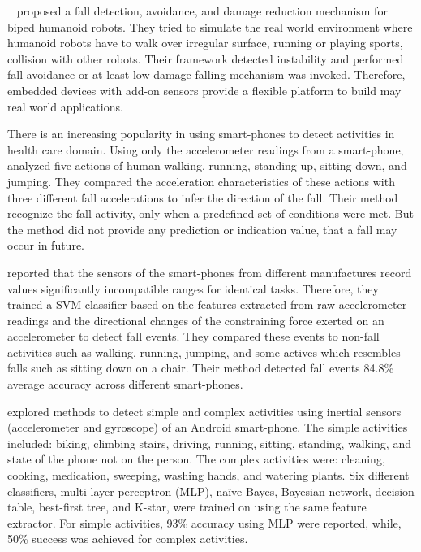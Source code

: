 \documentclass[letterpaper]{article}
\begin{document}
\begin{sloppy}
{~\cite{moya2014fall}} proposed a fall detection, avoidance, and damage 
reduction mechanism for biped humanoid robots. They tried to simulate the real world environment 
where humanoid robots have to walk over irregular surface, running or playing sports, collision 
with other robots. Their framework detected instability and performed fall avoidance or at 
least low-damage falling mechanism was invoked. Therefore, embedded devices  with add-on sensors 
provide a flexible platform to build may real world applications. 


There is an increasing popularity in using smart-phones to detect activities in health care domain. 
Using only the accelerometer readings from a smart-phone, \cite{bai2013recognition} analyzed five 
actions of human walking, running, standing up, sitting down, and jumping. They compared the 
acceleration characteristics of these actions with three different fall accelerations to infer the 
direction of the fall. Their method recognize the fall activity, only when a predefined set of 
conditions were met. But the method did not provide any prediction or indication value, that a fall 
may occur in future. 

\cite{steidl2012fall} reported that the sensors of the smart-phones from different manufactures 
record values significantly incompatible ranges for identical tasks. Therefore, they trained a SVM 
classifier based on the features extracted from raw accelerometer readings and the directional 
changes of the constraining force exerted on an accelerometer to detect fall events. They compared 
these events to non-fall activities such as walking, running, jumping, and some actives which 
resembles falls such as sitting down on a chair. Their method detected fall events 84.8\% average 
accuracy across different smart-phones. 

\cite{DernbachDKTC12} explored methods to detect simple and complex activities using inertial 
sensors (accelerometer and gyroscope) of an Android smart-phone. The simple activities included: 
biking, climbing stairs, driving, running, sitting, standing, walking, and state of the phone not 
on the person. The complex activities were: cleaning, cooking, medication, sweeping, washing hands, 
and watering plants. Six different classifiers, multi-layer  perceptron (MLP), na\"{i}ve  Bayes,  
Bayesian  network,  decision  table,  best-first tree, and  K-star,  were trained on using the same 
feature extractor. For simple activities, 93\% accuracy using MLP were reported, while, 50\% 
success was achieved for complex activities.    


\end{sloppy}
\end{document}
